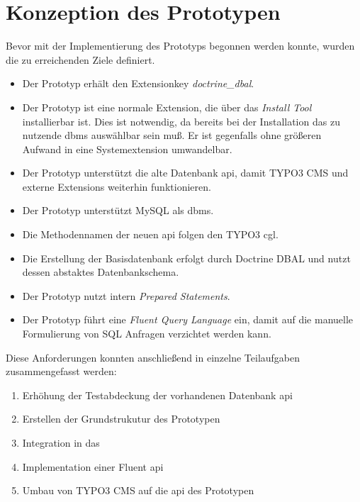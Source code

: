 \section{Konzeption des Prototypen}
\label{prototype:sec:concept}
Bevor mit der Implementierung des Prototyps begonnen werden konnte, wurden die zu erreichenden Ziele definiert.

\begin{itemize}
\item Der Prototyp erhält den Extensionkey \textit{doctrine\_dbal}.
\item  Der Prototyp ist eine normale Extension, die über das \textit{Install Tool} installierbar ist. Dies ist notwendig, da bereits bei der Installation das zu nutzende \gls{dbms} auswählbar sein muß. Er ist gegenfalls ohne größeren Aufwand in eine Systemextension umwandelbar.
\item Der Prototyp unterstützt die alte Datenbank \gls{api}, damit TYPO3 CMS und externe Extensions weiterhin funktionieren.
\item Der Prototyp unterstützt MySQL als \gls{dbms}.
\item Die Methodennamen der neuen \gls{api} folgen den TYPO3 \gls{cgl}.
\item Die Erstellung der Basisdatenbank erfolgt durch Doctrine DBAL und nutzt dessen abstaktes Datenbankschema.
\item Der Prototyp nutzt intern \textit{Prepared Statements}.
\item Der Prototyp führt eine \textit{Fluent Query Language} ein, damit auf die manuelle Formulierung von SQL Anfragen verzichtet werden kann.
\end{itemize}

Diese Anforderungen konnten anschließend in einzelne Teilaufgaben zusammengefasst werden:

\begin{enumerate}
\item Erhöhung der Testabdeckung der vorhandenen Datenbank \gls{api}
\item Erstellen der Grundstrukutur des Prototypen
\item Integration in das 
\item Implementation einer Fluent \gls{api}
\item Umbau von TYPO3 CMS auf die \gls{api} des Prototypen
\end{enumerate}
